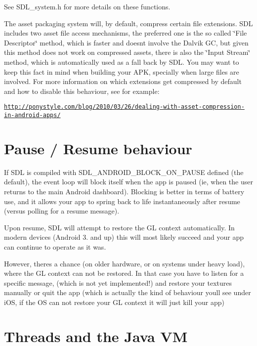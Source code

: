 See S\+D\+L\+\_\+system.\+h for more details on these functions.

The asset packaging system will, by default, compress certain file extensions. S\+DL includes two asset file access mechanisms, the preferred one is the so called \char`\"{}\+File Descriptor\char`\"{} method, which is faster and doesn\textquotesingle{}t involve the Dalvik GC, but given this method does not work on compressed assets, there is also the \char`\"{}\+Input Stream\char`\"{} method, which is automatically used as a fall back by S\+DL. You may want to keep this fact in mind when building your A\+PK, specially when large files are involved. For more information on which extensions get compressed by default and how to disable this behaviour, see for example\+:

\href{http://ponystyle.com/blog/2010/03/26/dealing-with-asset-compression-in-android-apps/}{\tt http\+://ponystyle.\+com/blog/2010/03/26/dealing-\/with-\/asset-\/compression-\/in-\/android-\/apps/}



 \section*{Pause / Resume behaviour }

If S\+DL is compiled with S\+D\+L\+\_\+\+A\+N\+D\+R\+O\+I\+D\+\_\+\+B\+L\+O\+C\+K\+\_\+\+O\+N\+\_\+\+P\+A\+U\+SE defined (the default), the event loop will block itself when the app is paused (ie, when the user returns to the main Android dashboard). Blocking is better in terms of battery use, and it allows your app to spring back to life instantaneously after resume (versus polling for a resume message).

Upon resume, S\+DL will attempt to restore the GL context automatically. In modern devices (Android 3. and up) this will most likely succeed and your app can continue to operate as it was.

However, there\textquotesingle{}s a chance (on older hardware, or on systems under heavy load), where the GL context can not be restored. In that case you have to listen for a specific message, (which is not yet implemented!) and restore your textures manually or quit the app (which is actually the kind of behaviour you\textquotesingle{}ll see under i\+OS, if the OS can not restore your GL context it will just kill your app)



 \section*{Threads and the Java VM }

